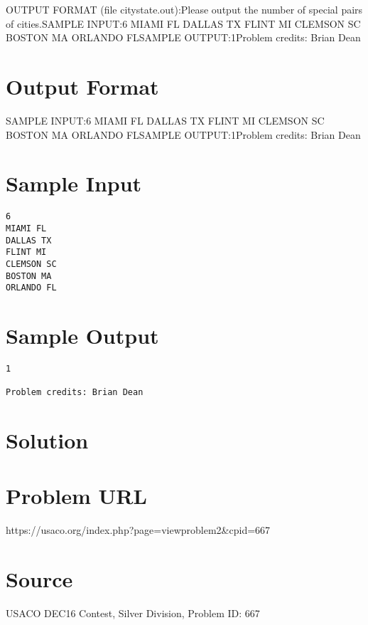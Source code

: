 \documentclass[12pt]{article}
\begin{document}
OUTPUT FORMAT (file citystate.out):Please output the number of special pairs of cities.SAMPLE INPUT:6
MIAMI FL
DALLAS TX
FLINT MI
CLEMSON SC
BOSTON MA
ORLANDO FLSAMPLE OUTPUT:1Problem credits: Brian Dean

\section*{Output Format}
SAMPLE INPUT:6
MIAMI FL
DALLAS TX
FLINT MI
CLEMSON SC
BOSTON MA
ORLANDO FLSAMPLE OUTPUT:1Problem credits: Brian Dean

\section*{Sample Input}
\begin{verbatim}
6
MIAMI FL
DALLAS TX
FLINT MI
CLEMSON SC
BOSTON MA
ORLANDO FL
\end{verbatim}

\section*{Sample Output}
\begin{verbatim}
1

Problem credits: Brian Dean
\end{verbatim}

\section*{Solution}


\section*{Problem URL}
https://usaco.org/index.php?page=viewproblem2&cpid=667

\section*{Source}
USACO DEC16 Contest, Silver Division, Problem ID: 667
\end{document}

